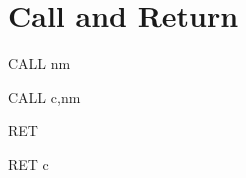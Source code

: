 \section{Call and Return}

\begin{minipage}{\textwidth}
	
\begin{instrtable}

    \begin{instruction}{CALL nm} 
            \FlagsCALLnn
        \SkipToSymbol
            \FromSymbolToOpCode
        \SkipToSymbol
            \FromSymbolToOpCode
        \SkipToSymbol
    \end{instruction}

    \begin{instruction}{CALL c,nm} 
            \FlagsCALLccnn
        \SkipToOpCode
        \SkipToOpCode
    \end{instruction}

    \begin{instruction}{RET} 
        \Symbol{\SymRET[0]}
            \FlagsRET
        \SkipToSymbol
            \Symbol{\SymRET[1]}
        \SkipToSymbol
            \Symbol{\SymRET[2]}
    \end{instruction}

    \begin{instruction}{RET c} 
            \FlagsRETcc
        \SkipToOpCode
            \OpCode{}{}{}
            \Hex{}{}
    \end{instruction}


\end{instrtable}
\end{minipage}
